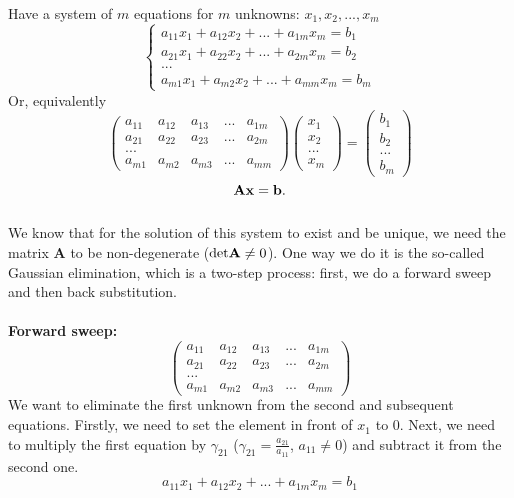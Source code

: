 \documentclass{article}
\begin{document}
Have a system of $m$ equations for $m$ unknowns: \(x_1, x_2, ..., x_m\)
\[
\begin{cases}
    a_{11}x_1 + a_{12}x_2 + ... + a_{1m}x_m = b_1\\
    a_{21}x_1 + a_{22}x_2 + ... + a_{2m}x_m = b_2\\
    ...\\
    a_{m1}x_1 + a_{m2}x_2 + ... + a_{mm}x_m = b_m
\end{cases}
\]
Or, equivalently
\[
\begin{pmatrix}
    a_{11} & a_{12} & a_{13} & ... & a_{1m}\\
    a_{21} & a_{22} & a_{23} & ... & a_{2m}\\
    ...\\
    a_{m1} & a_{m2} & a_{m3} & ... & a_{mm}
\end{pmatrix}
\begin{pmatrix}
    x_1\\
    x_2\\
    ...\\
    x_m
\end{pmatrix}
=
\begin{pmatrix}
    b_1\\
    b_2\\
    ...\\
    b_m
\end{pmatrix}
\]
\[
{\bf Ax} = {\bf b}.
\]
\\We know that for the solution of this system to exist and be unique, we need the matrix {\bf A} to be non-degenerate (${\rm det}{\bf A} \neq 0$). One way we do it is the so-called Gaussian elimination, which is a two-step process: first, we do a forward sweep and then back substitution.\\
\\{\bf Forward sweep:}
\[
\begin{pmatrix}
    a_{11} & a_{12} & a_{13} & ... & a_{1m}\\
    a_{21} & a_{22} & a_{23} & ... & a_{2m}\\
    ...\\
    a_{m1} & a_{m2} & a_{m3} & ... & a_{mm}
\end{pmatrix}
\]
We want to eliminate the first unknown from the second and subsequent equations. Firstly, we need to set the element in front of $x_1$ to 0. Next, we need to multiply the first equation by \(\gamma_{21}\) (\(\gamma_{21} = \frac{a_{21}}{a_{11}}\), \(a_{11} \neq 0\)) and subtract it from the second one.
\[
a_{11}x_1 + a_{12}x_2 + ... + a_{1m}x_m = b_1
\]
\end{document}
